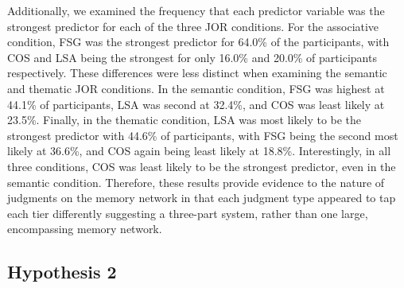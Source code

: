 \documentclass[english,man]{apa6}
\theoremstyle{definition}
\theoremstyle{definition}
\theoremstyle{definition}
\theoremstyle{remark}
\begin{document}
Additionally, we examined the frequency that each predictor variable was
the strongest predictor for each of the three JOR conditions. For the
associative condition, FSG was the strongest predictor for 64.0\% of the
participants, with COS and LSA being the strongest for only 16.0\% and
20.0\% of participants respectively. These differences were less
distinct when examining the semantic and thematic JOR conditions. In the
semantic condition, FSG was highest at 44.1\% of participants, LSA was
second at 32.4\%, and COS was least likely at 23.5\%. Finally, in the
thematic condition, LSA was most likely to be the strongest predictor
with 44.6\% of participants, with FSG being the second most likely at
36.6\%, and COS again being least likely at 18.8\%. Interestingly, in
all three conditions, COS was least likely to be the strongest
predictor, even in the semantic condition. Therefore, these results
provide evidence to the nature of judgments on the memory network in
that each judgment type appeared to tap each tier differently suggesting
a three-part system, rather than one large, encompassing memory network.

\subsection{Hypothesis 2}\label{hypothesis-2}
\end{document}
